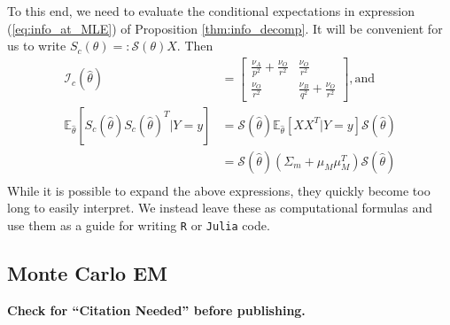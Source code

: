 \documentclass[11pt, oneside]{article}   	%
\newcommand{\bE}{\mathbb{E}}
\begin{document}
\begin{appendices}
    To this end, we need to evaluate the conditional expectations in expression (\ref{eq:info_at_MLE}) of Proposition \ref{thm:info_decomp}. It will be convenient for us to write $S_c(\theta) =: \mathscr{S}(\theta) X$. Then 
    \begin{align}
        \mathcal{I}_c(\hat{\theta}) &= \begin{bmatrix}
            \frac{\nu_A}{p^2} + \frac{\nu_O}{r^2} & \frac{\nu_O}{r^2}\\
            \frac{\nu_O}{r^2} & \frac{\nu_B}{q^2} + \frac{\nu_O}{r^2}
        \end{bmatrix} \mathrm{, and}\\
        \bE_{\hat{\theta}} [ S_c(\hat{\theta}) S_c(\hat{\theta})^T | Y=y] &= \mathscr{S}(\hat{\theta}) \bE_{\hat{\theta}} \left[ X X^T | Y=y \right] \mathscr{S}(\hat{\theta}) \\
        &= \mathscr{S}(\hat{\theta}) (\Sigma_m + \mu_M \mu_M^T) \mathscr{S}(\hat{\theta})\\
    \end{align}
    While it is possible to expand the above expressions, they quickly become too long to easily interpret. We instead leave these as computational formulas and use them as a guide for writing \texttt{R} or \texttt{Julia} code.


    \subsection{Monte Carlo EM}


\end{appendices}

\newpage

\textbf{Check for ``Citation Needed'' before publishing.}




\printindex
\end{document}
